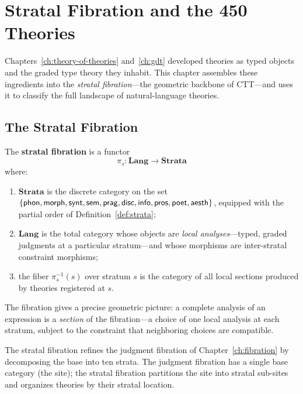 \chapter{Stratal Fibration and the 450 Theories}
\label{ch:strata}

Chapters~\ref{ch:theory-of-theories} and~\ref{ch:gdt} developed
theories as typed objects and the graded type theory they inhabit.
This chapter assembles these ingredients into the \emph{stratal
fibration}---the geometric backbone of CTT---and uses it to classify
the full landscape of natural-language theories.

\section{The Stratal Fibration}
\label{sec:stratal-fibration}

\begin{definition}
\label{def:stratal-fibration}
The \textbf{stratal fibration} is a functor
\[
  \pi_s : \mathbf{Lang} \to \mathbf{Strata}
\]
where:
\begin{enumerate}[label=(\alph*)]
\item $\mathbf{Strata}$ is the discrete category on the set
  $\{\mathsf{phon}, \mathsf{morph}, \mathsf{synt}, \mathsf{sem}, \mathsf{prag}, \mathsf{disc}, \mathsf{info}, \mathsf{pros},
  \mathsf{poet}, \mathsf{aesth}\}$, equipped with the partial order of
  Definition~\ref{def:strata};
\item $\mathbf{Lang}$ is the total category whose objects are
  \emph{local analyses}---typed, graded judgments at a particular
  stratum---and whose morphisms are inter-stratal constraint
  morphisms;
\item the fiber $\pi_s^{-1}(s)$ over stratum $s$ is the category
  of all local sections produced by theories registered at $s$.
\end{enumerate}
\end{definition}

The fibration gives a precise geometric picture: a complete analysis
of an expression is a \emph{section} of the fibration---a choice of
one local analysis at each stratum, subject to the constraint that
neighboring choices are compatible.

\begin{remark}
The stratal fibration refines the judgment fibration of
Chapter~\ref{ch:fibration} by decomposing the base into ten strata.
The judgment fibration has a single base category (the site); the
stratal fibration partitions the site into stratal sub-sites and
organizes theories by their stratal location.
\end{remark}


